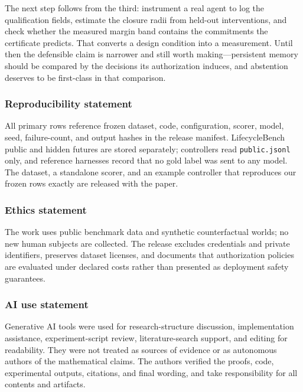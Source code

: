 \documentclass{article}
\begin{document}
The next step follows from the third: instrument a real agent to log the
qualification fields, estimate the closure radii from held-out interventions, and
check whether the measured margin band contains the commitments the certificate
predicts. That converts a design condition into a measurement. Until then the
defensible claim is narrower and still worth making---persistent memory should be
compared by the decisions its authorization induces, and abstention deserves to be
first-class in that comparison.

\subsubsection*{Reproducibility statement}
All primary rows reference frozen dataset, code, configuration, scorer, model,
seed, failure-count, and output hashes in the release manifest. LifecycleBench
public and hidden futures are stored separately; controllers read
\texttt{public.jsonl} only, and reference harnesses record that no gold label was
sent to any model. The dataset, a standalone scorer, and an example controller
that reproduces our frozen rows exactly are released with the paper.

\subsubsection*{Ethics statement}
The work uses public benchmark data and synthetic counterfactual worlds; no new
human subjects are collected. The release excludes credentials and private
identifiers, preserves dataset licenses, and documents that authorization
policies are evaluated under declared costs rather than presented as deployment
safety guarantees.

\subsubsection*{AI use statement}
Generative AI tools were used for research-structure discussion, implementation
assistance, experiment-script review, literature-search support, and editing for
readability. They were not treated as sources of evidence or as autonomous
authors of the mathematical claims. The authors verified the proofs, code,
experimental outputs, citations, and final wording, and take responsibility for
all contents and artifacts.




\appendix
\end{document}

